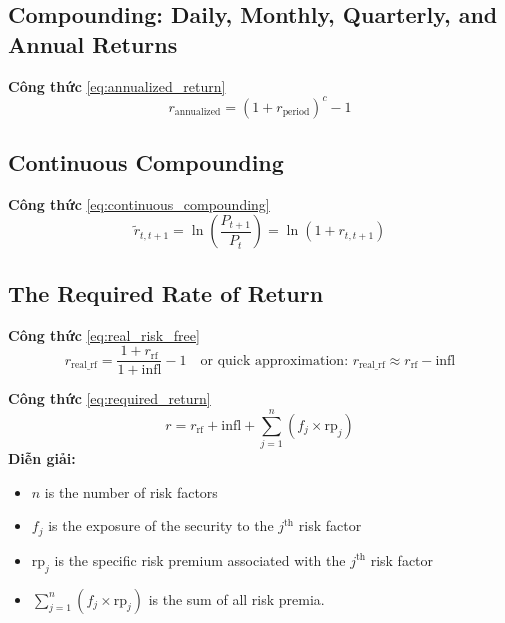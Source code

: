 \subsection*{Compounding: Daily, Monthly, Quarterly, and Annual Returns}
\begin{tcolorbox}[colback=blue!3!white, colframe=trustvilleblue!80!black, boxrule=0.5pt, arc=3pt, left=6pt, right=6pt, top=4pt, bottom=4pt, breakable]
\noindent\textbf{Công thức} \eqref{eq:annualized_return}
\vspace{-0.4em}
\[
r_{\text{annualized}} = (1 + r_{\text{period}})^c - 1
\]
\end{tcolorbox}
\vspace{0.3em}
\subsection*{Continuous Compounding}
\begin{tcolorbox}[colback=blue!3!white, colframe=trustvilleblue!80!black, boxrule=0.5pt, arc=3pt, left=6pt, right=6pt, top=4pt, bottom=4pt, breakable]
\noindent\textbf{Công thức} \eqref{eq:continuous_compounding}
\vspace{-0.4em}
\[
\tilde{r}_{t, t+1} = \ln \left( \frac{P_{t+1}}{P_t} \right) = \ln(1 + r_{t, t+1})
\]
\end{tcolorbox}
\vspace{0.3em}
\subsection*{The Required Rate of Return}
\begin{tcolorbox}[colback=blue!3!white, colframe=trustvilleblue!80!black, boxrule=0.5pt, arc=3pt, left=6pt, right=6pt, top=4pt, bottom=4pt, breakable]
\noindent\textbf{Công thức} \eqref{eq:real_risk_free}
\vspace{-0.4em}
\[
r_{\text{real\_rf}} = \frac{1 + r_{\text{rf}}}{1 + \text{infl}} - 1 \quad \text{or quick approximation: } r_{\text{real\_rf}} \approx r_{\text{rf}} - \text{infl}
\]
\end{tcolorbox}
\vspace{0.3em}
\begin{tcolorbox}[colback=blue!3!white, colframe=trustvilleblue!80!black, boxrule=0.5pt, arc=3pt, left=6pt, right=6pt, top=4pt, bottom=4pt, breakable]
\noindent\textbf{Công thức} \eqref{eq:required_return}
\vspace{-0.4em}
\[
r = r_{\text{rf}} + \text{infl} + \sum_{j=1}^{n} (f_j \times \text{rp}_j)
\]
\noindent\textbf{Diễn giải:}
\begin{itemize}[leftmargin=1.5em, noitemsep, topsep=2pt, parsep=0pt]
  \item $n$ is the number of risk factors
  \item $f_{j}$ is the exposure of the security to the $j^{\text{th}}$ risk factor
  \item $\text{rp}_j$ is the specific risk premium associated with the $j^{\text{th}}$ risk factor
  \item $\sum_{j=1}^{n} (f_j \times \text{rp}_j)$ is the sum of all risk premia.
\end{itemize}
\end{tcolorbox}
\vspace{0.3em}
